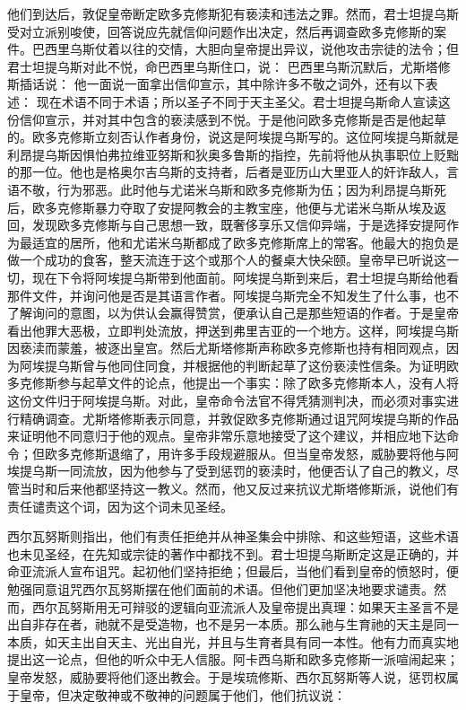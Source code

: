 他们到达后，敦促皇帝断定欧多克修斯犯有亵渎和违法之罪。然而，君士坦提乌斯受对立派别唆使，回答说应先就信仰问题作出决定，然后再调查欧多克修斯的案件。巴西里乌斯仗着以往的交情，大胆向皇帝提出异议，说他攻击宗徒的法令；但君士坦提乌斯对此不悦，命巴西里乌斯住口，说： 巴西里乌斯沉默后，尤斯塔修斯插话说： 他一面说一面拿出信仰宣示，其中除许多不敬之词外，还有以下表述：  现在术语不同于术语；所以圣子不同于天主圣父。君士坦提乌斯命人宣读这份信仰宣示，并对其中包含的亵渎感到不悦。于是他问欧多克修斯是否是他起草的。欧多克修斯立刻否认作者身份，说这是阿埃提乌斯写的。这位阿埃提乌斯就是利昂提乌斯因惧怕弗拉维亚努斯和狄奥多鲁斯的指控，先前将他从执事职位上贬黜的那一位。他也是格奥尔吉乌斯的支持者，后者是亚历山大里亚人的奸诈敌人，言语不敬，行为邪恶。此时他与尤诺米乌斯和欧多克修斯为伍；因为利昂提乌斯死后，欧多克修斯暴力夺取了安提阿教会的主教宝座，他便与尤诺米乌斯从埃及返回，发现欧多克修斯与自己思想一致，既奢侈享乐又信仰异端，于是选择安提阿作为最适宜的居所，他和尤诺米乌斯都成了欧多克修斯席上的常客。他最大的抱负是做一个成功的食客，整天流连于这个或那个人的餐桌大快朵颐。皇帝早已听说这一切，现在下令将阿埃提乌斯带到他面前。阿埃提乌斯到来后，君士坦提乌斯给他看那件文件，并询问他是否是其语言作者。阿埃提乌斯完全不知发生了什么事，也不了解询问的意图，以为供认会赢得赞赏，便承认自己是那些短语的作者。于是皇帝看出他罪大恶极，立即判处流放，押送到弗里吉亚的一个地方。这样，阿埃提乌斯因亵渎而蒙羞，被逐出皇宫。然后尤斯塔修斯声称欧多克修斯也持有相同观点，因为阿埃提乌斯曾与他同住同食，并根据他的判断起草了这份亵渎性信条。为证明欧多克修斯参与起草文件的论点，他提出一个事实：除了欧多克修斯本人，没有人将这份文件归于阿埃提乌斯。对此，皇帝命令法官不得凭猜测判决，而必须对事实进行精确调查。尤斯塔修斯表示同意，并敦促欧多克修斯通过诅咒阿埃提乌斯的作品来证明他不同意归于他的观点。皇帝非常乐意地接受了这个建议，并相应地下达命令；但欧多克修斯退缩了，用许多手段规避服从。但当皇帝发怒，威胁要将他与阿埃提乌斯一同流放，因为他参与了受到惩罚的亵渎时，他便否认了自己的教义，尽管当时和后来他都坚持这一教义。然而，他又反过来抗议尤斯塔修斯派，说他们有责任谴责这个词，因为这个词未见圣经。\par

西尔瓦努斯则指出，他们有责任拒绝并从神圣集会中排除、和这些短语，这些术语也未见圣经，在先知或宗徒的著作中都找不到。君士坦提乌斯断定这是正确的，并命亚流派人宣布诅咒。起初他们坚持拒绝；但最后，当他们看到皇帝的愤怒时，便勉强同意诅咒西尔瓦努斯摆在他们面前的术语。但他们更加坚决地要求谴责。然而，西尔瓦努斯用无可辩驳的逻辑向亚流派人及皇帝提出真理：如果天主圣言不是出自非存在者，祂就不是受造物，也不是另一本质。那么祂与生育祂的天主是同一本质，如天主出自天主、光出自光，并且与生育者具有同一本性。他有力而真实地提出这一论点，但他的听众中无人信服。阿卡西乌斯和欧多克修斯一派喧闹起来；皇帝发怒，威胁要将他们逐出教会。于是埃琉修斯、西尔瓦努斯等人说，惩罚权属于皇帝，但决定敬神或不敬神的问题属于他们，他们抗议说：\par

